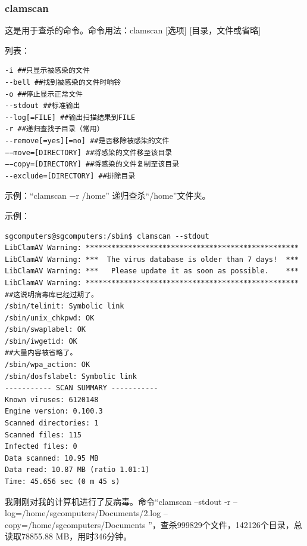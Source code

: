 \documentclass{book}
\begin{document}
\subsubsection{clamscan}
\cite{mancs}\par
这是用于查杀的命令。命令用法：clamscan [选项] [目录，文件或省略]\par
[选项]列表：\par
\begin{verbatim}
-i ##只显示被感染的文件
--bell ##找到被感染的文件时响铃
-o ##停止显示正常文件
--stdout ##标准输出
--log[=FILE] ##输出扫描结果到FILE
-r ##递归查找子目录（常用）
--remove[=yes][=no] ##是否移除被感染的文件
−−move=[DIRECTORY] ##将感染的文件移至该目录
−−copy=[DIRECTORY] ##将感染的文件复制至该目录
--exclude=[DIRECTORY] ##排除目录
\end{verbatim}
示例：“clamscan −r /home”  递归查杀“/home”文件夹。\par
示例：
\begin{verbatim}
sgcomputers@sgcomputers:/sbin$ clamscan --stdout
LibClamAV Warning: **************************************************
LibClamAV Warning: ***  The virus database is older than 7 days!  ***
LibClamAV Warning: ***   Please update it as soon as possible.    ***
LibClamAV Warning: **************************************************
##这说明病毒库已经过期了。
/sbin/telinit: Symbolic link
/sbin/unix_chkpwd: OK
/sbin/swaplabel: OK
/sbin/iwgetid: OK
##大量内容被省略了。
/sbin/wpa_action: OK
/sbin/dosfslabel: Symbolic link
----------- SCAN SUMMARY -----------
Known viruses: 6120148
Engine version: 0.100.3
Scanned directories: 1
Scanned files: 115
Infected files: 0
Data scanned: 10.95 MB
Data read: 10.87 MB (ratio 1.01:1)
Time: 45.656 sec (0 m 45 s)
\end{verbatim}
{\color{red}{注意，我非常建议你使用root权限！否则大部分病毒会移除失败！\par 误报率较高，建议不要使用“--remove=yes”或“--move=[dir]”选项。}}\par
我刚刚对我的计算机进行了反病毒。命令“clamscan --stdout -r
 --log=/home/sgcomputers/Documents/2.log --copy=/home/sgcomputers/Documents
”，查杀999829个文件，142126个目录，总读取78855.88 MB，用时346分钟。
\end{document}
